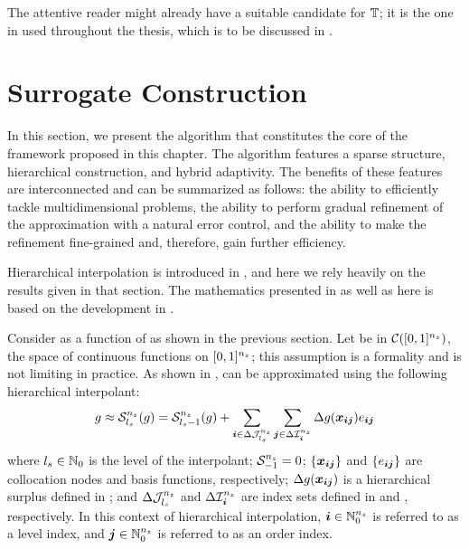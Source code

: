 The attentive reader might already have a suitable candidate for $\transform$;
it is the one in  used throughout the thesis,
which is to be discussed in .

\section{Surrogate Construction}

In this section, we present the algorithm that constitutes the core of the
framework proposed in this chapter. The algorithm features a sparse structure,
hierarchical construction, and hybrid adaptivity. The benefits of these features
are interconnected and can be summarized as follows: the ability to efficiently
tackle multidimensional problems, the ability to perform gradual refinement of
the approximation with a natural error control, and the ability to make the
refinement fine-grained and, therefore, gain further efficiency.

Hierarchical interpolation is introduced in , and
here we rely heavily on the results given in that section. The mathematics
presented in  as well as here is based on the
development in \cite{klimke2006, ma2009, jakeman2012}.

Consider \g as a function of \vz as shown in the previous section. Let \g be in
$\mathcal{C}([0, 1]^{n_{z}})$, the space of continuous functions on $[0, 1]^{n_{z}}$;
this assumption is a formality and is not limiting in practice. As shown in
, \g can be approximated using the following
hierarchical interpolant:
\[
  g \approx \mathcal{S}^{{n_{z}}}_{{l_{s}}}(g)
  = \mathcal{S}^{{n_{z}}}_{{l_{s}} - 1}(g) + \sum_{\boldsymbol{i} \in \Delta\mathcal{J}^{{n_{z}}}_{{l_{s}}}} \sum_{\boldsymbol{j} \in \Delta\mathcal{I}^{{n_{z}}}_{\boldsymbol{i}}} \Delta g(\boldsymbol{x}_{\boldsymbol{i} \boldsymbol{j}}) e_{\boldsymbol{i} \boldsymbol{j}}
\]
where ${l_{s}} \in \mathbb{N}_{0}$ is the level of the interpolant; $\mathcal{S}^{{n_{z}}}_{-1}
= 0$; $\{ \boldsymbol{x}_{\boldsymbol{i} \boldsymbol{j}} \}$ and $\{ e_{\boldsymbol{i} \boldsymbol{j}} \}$ are collocation nodes and
basis functions, respectively; $\Delta g(\boldsymbol{x}_{\boldsymbol{i} \boldsymbol{j}})$ is a hierarchical
surplus defined in ; and
$\Delta\mathcal{J}^{{n_{z}}}_{{l_{s}}}$ and $\Delta\mathcal{I}^{{n_{z}}}_{\boldsymbol{i}}$ are index sets
defined in  and
, respectively. In this context of
hierarchical interpolation, $\boldsymbol{i} \in \mathbb{N}_{0}^{n_{z}}$ is referred to as a level
index, and $\boldsymbol{j} \in \mathbb{N}_{0}^{n_{z}}$ is referred to as an order index.

